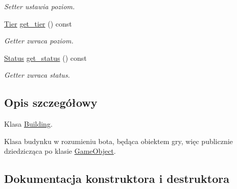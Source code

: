 \begin{DoxyCompactItemize}
\begin{DoxyCompactList}\small\item\em Setter ustawia poziom. \end{DoxyCompactList}\item 
\mbox{\label{classmodel_1_1Building_a936de4be97a21d6b94fd5cddaab65ada}} 
\hyperlink{tier_8hpp_a50a003ab1ea342f138c038fabfd1ee55}{Tier} \hyperlink{classmodel_1_1Building_a936de4be97a21d6b94fd5cddaab65ada}{get\+\_\+tier} () const
\begin{DoxyCompactList}\small\item\em Getter zwraca poziom. \end{DoxyCompactList}\item 
\mbox{\label{classmodel_1_1Building_afd19261eed95d8568da5134ac62b9e1f}} 
\hyperlink{status_8hpp_a822822ece62ee330ee656034849df887}{Status} \hyperlink{classmodel_1_1Building_afd19261eed95d8568da5134ac62b9e1f}{get\+\_\+status} () const
\begin{DoxyCompactList}\small\item\em Getter zwraca status. \end{DoxyCompactList}\end{DoxyCompactItemize}


\subsection{Opis szczegółowy}
Klasa \hyperlink{classmodel_1_1Building}{Building}. 

Klasa budynku w rozumieniu bota, będąca obiektem gry, więc publicznie dziedzicząca po klasie \hyperlink{classmodel_1_1GameObject}{Game\+Object}. 

\subsection{Dokumentacja konstruktora i destruktora}
\mbox{\label{classmodel_1_1Building_a17a7270e4283374db400aff509e59f27}} 

